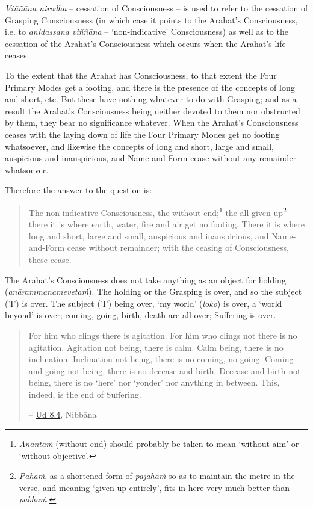 \emph{Viññāna nirodha} -- cessation of Consciousness -- is used to refer to the cessation of Grasping Consciousness (in which case it points to the Arahat's Consciousness, i.e. to \emph{anidassana viññāna} -- `non-indicative' Consciousness) as well as to the cessation of the Arahat's Consciousness which occurs when the Arahat's life ceases.

To the extent that the Arahat has Consciousness, to that extent the Four Primary Modes get a footing, and there is the presence of the concepts of long and short, etc. But these have nothing whatever to do with Grasping; and as a result the Arahat's Consciousness being neither devoted to them nor obstructed by them, they bear no significance whatever. When the Arahat's Consciousness ceases with the laying down of life the Four Primary Modes get no footing whatsoever, and likewise the concepts of long and short, large and small, auspicious and inauspicious, and Name-and-Form cease without any remainder whatsoever.

Therefore the answer to the question is:

\begin{quote}
The non-indicative Consciousness, the without end;\footnote{\emph{Anantaṁ} (without end) should probably be taken to mean `without aim' or `without objective'.} the all given up\footnote{\emph{Pahaṁ}, as a shortened form of \emph{pajahaṁ} so as to maintain the metre in the verse, and meaning `given up entirely', fits in here very much better than \emph{pabhaṁ}.} -- there it is where earth, water, fire and air get no footing. There it is where long and short, large and small, auspicious and inauspicious, and Name-and-Form cease without remainder; with the ceasing of Consciousness, these cease.
\end{quote}

The Arahat's Consciousness does not take anything as an object for holding (\emph{anārammanamevetaṁ}). The holding or the Grasping is over, and so the subject ('I') is over. The subject ('I') being over, `my world' (\emph{loko}) is over, a `world beyond' is over; coming, going, birth, death are all over; Suffering is over.

\begin{quote}
For him who clings there is agitation. For him who clings not there is no agitation. Agitation not being, there is calm. Calm being, there is no inclination. Inclination not being, there is no coming, no going. Coming and going not being, there is no decease-and-birth. Decease-and-birth not being, there is no `here' nor `yonder' nor anything in between. This, indeed, is the end of Suffering.

 -- \href{https://suttacentral.net/ud8.4/en/anandajoti}{Ud 8.4}, Nibbāna
\end{quote}

